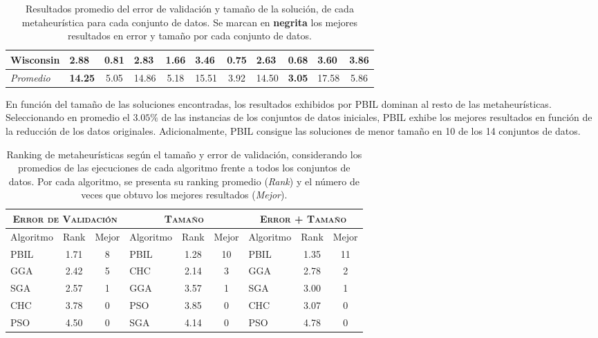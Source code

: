 \begin{table}[h!]
\begin{tabular}{l g c g c g c g c g c}
Wisconsin    &  2.88 &  0.81 &  2.83 & 1.66 &  3.46 & 0.75 & \textbf{2.63} & \textbf{0.68} &  3.60 &  3.86 \\
\hline
\emph{Promedio} & \textbf{14.25} & 5.05 & 14.86 & 5.18 & 15.51 & 3.92 & 14.50 & \textbf{3.05} & 17.58 & 5.86\\
\hline
\end{tabular}
\caption[Resultados promedio por metaheurística y conjunto de datos]{Resultados promedio del error de validación y tamaño de la solución, de cada metaheurística para cada conjunto de datos. Se marcan en \textbf{negrita} los mejores resultados en error y tamaño por cada conjunto de datos.}
\label{res-all}
\end{table}

En función del tamaño de las soluciones encontradas, los resultados exhibidos por PBIL dominan al resto de las metaheurísticas. Seleccionando en promedio el $3.05\%$ de las instancias de los conjuntos de datos iniciales, PBIL exhibe los mejores resultados en función de la reducción de los datos originales. Adicionalmente, PBIL consigue las soluciones de menor tamaño en 10 de los 14 conjuntos de datos.

\begin{table}[h!]
\centering
\begin{tabular}{l c c|l c c|l c c}
\hline
\multicolumn{3}{c|}{\textsc{Error de Validación}}
	& \multicolumn{3}{c|}{\textsc{Tamaño}}
	& \multicolumn{3}{c}{\textsc{Error + Tamaño}} \\
\hline
Algoritmo & Rank & Mejor & Algoritmo & Rank & Mejor & Algoritmo & Rank & Mejor \\
\hline
\hline
PBIL & 1.71 & 8 & PBIL & 1.28 & 10 & PBIL & 1.35 & 11 \\
GGA  & 2.42 & 5 & CHC  & 2.14 &  3 & GGA  & 2.78 &  2 \\
SGA  & 2.57 & 1 & GGA  & 3.57 &  1 & SGA  & 3.00 &  1 \\
CHC  & 3.78 & 0 & PSO  & 3.85 &  0 & CHC  & 3.07 &  0 \\
PSO  & 4.50 & 0 & SGA  & 4.14 &  0 & PSO  & 4.78 &  0 \\
\hline
\end{tabular}
\caption[Ranking de metaheurísticas según el tamaño y error de validación en conjuntos de datos grandes]{Ranking de metaheurísticas según el tamaño y error de validación, considerando los promedios de las ejecuciones de cada algoritmo frente a todos los conjuntos de datos. Por cada algoritmo, se presenta su ranking promedio (\emph{Rank}) y el número de veces que obtuvo los mejores resultados (\emph{Mejor}).}
\label{res-all-rank}
\end{table}

